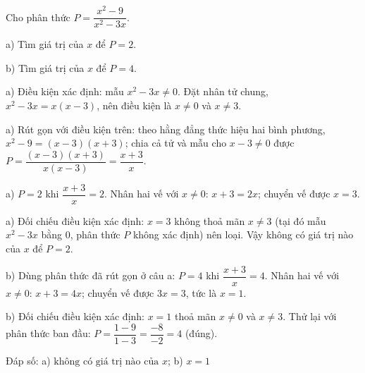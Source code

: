 \begin{problem}[8DS-PS-025]
Cho phân thức $P = \dfrac{x^2 - 9}{x^2 - 3x}$.

a) Tìm giá trị của $x$ để $P = 2$.

b) Tìm giá trị của $x$ để $P = 4$.

\begin{solution}
a) Điều kiện xác định: mẫu $x^2 - 3x \neq 0$. Đặt nhân tử chung, $x^2 - 3x = x(x - 3)$, nên điều kiện là $x \neq 0$ và $x \neq 3$.

a) Rút gọn với điều kiện trên: theo hằng đẳng thức hiệu hai bình phương, $x^2 - 9 = (x - 3)(x + 3)$; chia cả tử và mẫu cho $x - 3 \neq 0$ được $P = \dfrac{(x - 3)(x + 3)}{x(x - 3)} = \dfrac{x + 3}{x}$.

a) $P = 2$ khi $\dfrac{x + 3}{x} = 2$. Nhân hai vế với $x \neq 0$: $x + 3 = 2x$; chuyển vế được $x = 3$.

a) Đối chiếu điều kiện xác định: $x = 3$ không thoả mãn $x \neq 3$ (tại đó mẫu $x^2 - 3x$ bằng $0$, phân thức $P$ không xác định) nên loại. Vậy không có giá trị nào của $x$ để $P = 2$.

b) Dùng phân thức đã rút gọn ở câu a: $P = 4$ khi $\dfrac{x + 3}{x} = 4$. Nhân hai vế với $x \neq 0$: $x + 3 = 4x$; chuyển vế được $3x = 3$, tức là $x = 1$.

b) Đối chiếu điều kiện xác định: $x = 1$ thoả mãn $x \neq 0$ và $x \neq 3$. Thử lại với phân thức ban đầu: $P = \dfrac{1 - 9}{1 - 3} = \dfrac{-8}{-2} = 4$ (đúng).

Đáp số: a) $\boxed{\text{không có giá trị nào của } x}$; b) $\boxed{x = 1}$
\end{solution}
\end{problem}

